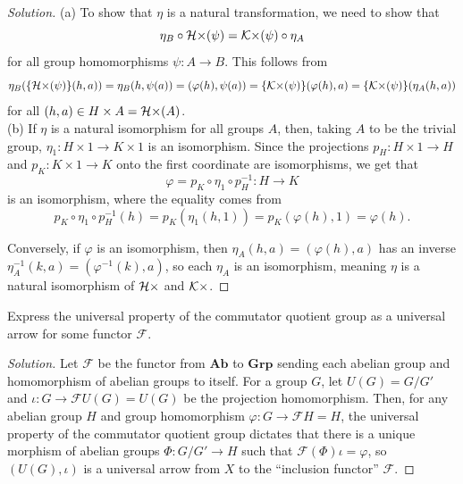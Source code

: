 \documentclass[10pt]{article}
\providecommand{\inv}{^{-1}}
\newenvironment{soln}{\begin{proof}[Solution]}{\end{proof}}
\begin{document}
\begin{soln}
    (a) To show that $\eta$ is a natural transformation, we need to show that
    \begin{equation*}
        \eta_B\circ\mathcal H{\times}(\psi) = \mathcal K{\times}(\psi)\circ\eta_A
    \end{equation*}
    for all group homomorphisms $\psi\colon A\to B$.
    This follows from
    \begin{equation*}
	\eta_B(\{\mathcal H{\times}(\psi)\}(h,a))
	= \eta_B(h,\psi(a)) = (\varphi(h),\psi(a))
	= \{\mathcal K{\times}(\psi)\}(\varphi(h),a) = \{\mathcal K{\times}(\psi)\}(\eta_A(h,a))
    \end{equation*}
    for all $(h,a)\in H\times A = \mathcal H{\times}(A)$.
    \\

    (b) If $\eta$ is a natural isomorphism for all groups $A$, then,
    taking $A$ to be the trivial group,
    $\eta_1\colon H\times 1\to K\times 1$
    is an isomorphism. Since the projections
    $p_H\colon H\times 1\to H$ and $p_K\colon K\times 1\to K$
    onto the first coordinate are isomorphisms, we get that
    \begin{equation*}
        \varphi = p_K\circ\eta_1\circ p_H\inv\colon H\to K
    \end{equation*}
    is an isomorphism, where the equality comes from
    \begin{equation*}
        p_K\circ\eta_1\circ p_H\inv(h) =
	p_K(\eta_1(h,1)) = p_K(\varphi(h),1) = \varphi(h).
    \end{equation*}

    Conversely, if $\varphi$ is an isomorphism, then
    $\eta_A(h,a) = (\varphi(h),a)$ has an inverse
    $\eta_A\inv(k,a) = (\varphi\inv(k),a)$, so each $\eta_A$ is an isomorphism,
    meaning $\eta$ is a natural isomorphism of $\mathcal H{\times}$ and $\mathcal K{\times}$.
\end{soln}

\begin{problem}
    [Appendix II \S2 \#3]
    Express the universal property of the commutator quotient group
    as a universal arrow for some functor $\mathcal F$.
\end{problem}

\begin{soln}
    Let $\mathcal F$ be the functor from $\mathbf{Ab}$ to $\mathbf{Grp}$
    sending each abelian group and homomorphism of abelian groups
    to itself. For a group $G$, let $U(G) = G/G'$
    and $\iota\colon G\to \mathcal FU(G) = U(G)$ be the projection homomorphism.
    Then, for any abelian group $H$ and group homomorphism
    $\varphi\colon G\to \mathcal FH=H$, the universal property of
    the commutator quotient group dictates that there is a unique
    morphism of abelian groups $\Phi\colon G/G'\to H$
    such that $\mathcal F(\Phi)\iota = \varphi$, so
    $(U(G),\iota)$ is a universal arrow from $X$ to
    the ``inclusion functor'' $\mathcal F$.
\end{soln}
\end{document}
